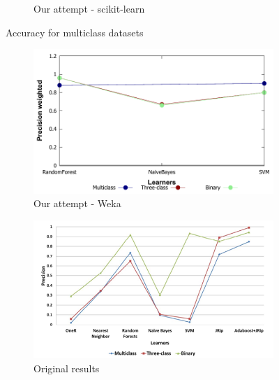 \begin{figure}[H]
\begin{subfigure}[t]{0.4\textwidth}
        \caption{Our attempt - scikit-learn}
    \end{subfigure}
    \caption{Accuracy for multiclass datasets}
    \label{fig:weka_accall}
\end{figure}

\begin{figure}[H]
    \centering
    \begin{subfigure}[t]{0.4\textwidth}
        \includegraphics[width=\linewidth]{images/weka_precweight}
        \caption{Our attempt - Weka}
    \end{subfigure}%
    \begin{subfigure}[t]{0.4\textwidth}
        \includegraphics[width=\linewidth]{images/weka_precision_cite.png}
        \caption{Original results \cite{borges_hink_machine_2014-1}}
    \end{subfigure}
    \begin{subfigure}[t]{0.4\textwidth}

\end{subfigure}
\end{figure}
